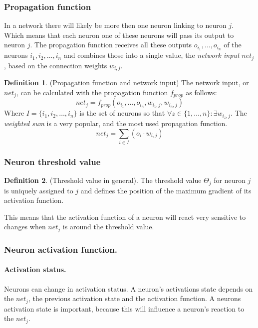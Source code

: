 \documentclass[pdftex,a4paper,12pt,twoside]{report}
\theoremstyle{plain} \newtheorem{theorem}{Theorem} \newtheorem{proposition}{Proposition} \newtheorem{lemma}{Lemma} \newtheorem*{corollary}{Corollary}
\theoremstyle{definition} \newtheorem{definition}{Definition} \newtheorem{conjecture}{Conjecture} \newtheorem*{example}{Example} \newtheorem{algorithm}{Algorithm}
\theoremstyle{remark} \newtheorem*{remark}{Remark} \newtheorem*{note}{Note} \newtheorem{case}{Case}
\begin{document}
\subsubsection{Propagation function}
In a network there will likely be more then one neuron linking to neuron $j$. Which means that each neuron one of these neurons will pass its output to neuron $j$. The propagation function receives all these outputs $o_{i_{1}},\dotsc,o_{i_{n}}$ of the neurons $i_1,i_2,\dotsc,i_n$ and combines those into a single value, the \emph{network input} $net_j$, based on the connection weights $w_{i,j}$.
\begin{definition}
(Propagation function and network input) The network input, or $net_j$, can be calculated with the propagation function $f _{prop}$ as follows:
\begin{equation}
net_j = f _{prop}(o_{i_{1}},\dotsc,o_{i_{n}},w_{i_{1},j},w_{i_{n},j})
\end{equation}
Where $I = \{i_1,i_2,\dotsc,i_n\}$ is the set of neurons so that $\forall z \in \{1,\dotsc,n\} : \exists w_{i_{z},j}$. The \emph{weighted sum} is a very popular, and the most used propagation function.
\begin{equation}
net_j = \sum_{i \in I}(o_i \cdot w_{i,j})
\end{equation}
\end{definition}
\subsubsection{Neuron threshold value}
\begin{definition}
(Threshold value in general). The threshold value $\Theta_j$ for neuron $j$ is uniquely assigned to $j$ and defines the position of the maximum gradient of its activation function.
\end{definition}
This means that the activation function of a neuron will react very sensitive to changes when $net_j$ is around the threshold value. 
\subsubsection{Neuron activation function.}
\paragraph{Activation status.}Neurons can change in activation status. A neuron's activations state depends on the $net_j$, the previous activation state and the activation function. A neurons activation state is important, because this will influence a neuron's reaction to the $net_j$.
\end{document}
